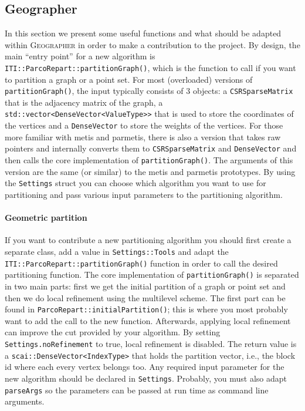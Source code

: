 \documentclass[a4paper,10pt]{article}
\newcommand{\geo}{\textsc{Geographer} }
\newcommand{\quot}[1]{``#1''}
\newcommand{\MI}[1]{\texttt{#1}}
\begin{document}
\clearpage


\subsection*{Geographer }

In this section we present some useful functions and what should be adapted within 
\geo in order to make a contribution to the project.
By design, the main \quot{entry point} for a new algorithm is 
\MI{ITI::ParcoRepart::partitionGraph()}, which
is the function to call if you want to partition a graph or a point set. 
For most (overloaded) versions of \MI{partitionGraph()}, 
the input typically consists of 3 objects: a \MI{CSRSparseMatrix} that is the adjacency 
matrix of the graph, 
a \MI{std::vector<DenseVector<ValueType>>} that is used to store the coordinates of the 
vertices and a \MI{DenseVector} to store the weights of the vertices.
For those more familiar with metis and parmetis, there is also a version that takes 
raw pointers and internally converts them to \MI{CSRSparseMatrix} and \MI{DenseVector} 
and then calls the core implementation of \MI{partitionGraph()}. 
The arguments of this version are the same (or similar) to the metis and parmetis prototypes.
By using the \MI{Settings} struct you can choose which algorithm you want to use for 
partitioning and pass various input parameters to the partitioning algorithm.

\paragraph*{Geometric partition}
If you want to contribute a new partitioning algorithm
you should first create a separate class, add a value in \MI{Settings::Tools} and adapt the 
\MI{ITI::ParcoRepart::partitionGraph()} function in order to call the desired partitioning function.
The core implementation of \MI{partitionGraph()} is separated in two main parts: 
first we get the initial partition of a graph or point set and then we do local refinement using 
the multilevel scheme. 
The first part can be found in \MI{ParcoRepart::initialPartition()}; this is where you most probably
want to add the call to the new function. Afterwards, applying
local refinement can improve the cut provided by your algorithm.
By setting \MI{Settings.noRefinement} to true, local refinement is disabled.
The return value is a \MI{scai::DenseVector<IndexType>} that holds the partition vector, i.e., 
the block id where each every vertex belongs too.
Any required input parameter for the new algorithm should be declared in \MI{Settings}.
Probably, you must also adapt \MI{parseArgs} so the parameters can be passed at run time as 
command line arguments.
\end{document}
